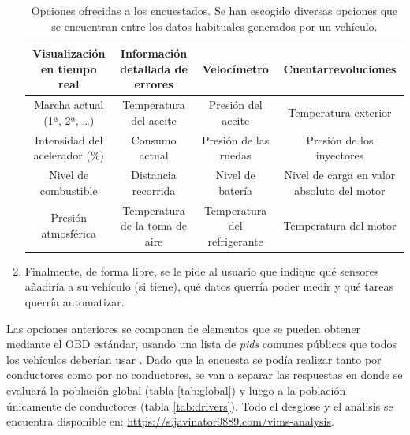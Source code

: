 \begin{enumerate}
        \begin{table}[H]
          \centering
          \begin{tabularx}{\textwidth}{| C{.25} | C{.25} | C{.25}| C{.25} |}
            \hline
            Visualización en tiempo real   & Información detallada de errores & Velocímetro                  & Cuentarrevoluciones                        \\
            \hline
            Marcha actual (1ª, 2ª, \dots)  & Temperatura del aceite           & Presión del aceite           & Temperatura exterior                       \\
            \hline
            Intensidad del acelerador (\%) & Consumo actual                   & Presión de las ruedas        & Presión de los inyectores                  \\
            \hline
            Nivel de combustible           & Distancia recorrida              & Nivel de batería             & Nivel de carga en valor absoluto del motor \\
            \hline
            Presión atmosférica            & Temperatura de la toma de aire   & Temperatura del refrigerante & Temperatura del motor                      \\
            \hline
          \end{tabularx}
          \caption{Opciones ofrecidas a los encuestados. Se han escogido diversas opciones que se encuentran entre los datos habituales generados por un vehículo.}
          \label{tab:options}
        \end{table}
  \item Finalmente, de forma libre, se le pide al usuario que indique qué sensores
        añadiría a su vehículo (si tiene), qué datos querría poder medir y qué
        tareas querría automatizar.
\end{enumerate}

Las opciones anteriores se componen de elementos que se pueden obtener mediante el
\ac{OBD} estándar, usando una lista de \textit{pids} comunes públicos que
todos los vehículos deberían usar \cite{OBDIIPIDs2021}. Dado que la encuesta se
podía realizar tanto por conductores como por no conductores, se van a separar las
respuestas en donde se evaluará la población global (tabla \ref{tab:global}) y
luego a la población únicamente de conductores (tabla \ref{tab:drivers}).
Todo el desglose y el análisis se encuentra disponible en:
\url{https://s.javinator9889.com/vims-analysis}.

